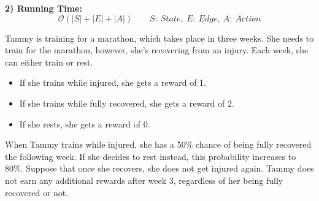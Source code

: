 \documentclass[10pt,a4paper,answers]{exam}
\begin{document}
{\begin{questions}
\begin{solution}
\textbf{2) Running Time:}
\[\mathcal{O}(|S| + |E| + |A|) \qquad S:\ State,\ E:\ Edge,\ A:\ Action\]

\end{solution}


\question[35]
Tammy is training for a marathon, which takes place in three weeks. She needs to train for the marathon, however, she's recovering from an injury. Each week, she can either train or rest. 
\begin{itemize}
    \item If she trains while injured, she gets a reward of 1.
    \item If she trains while fully recovered, she gets a reward of 2.
    \item If she rests, she gets a reward of 0.
\end{itemize}
When Tammy trains while injured, she has a 50\% chance of being fully recovered the following week. If she decides to rest instead, this probability increases to 80\%. Suppose that once she recovers, she does not get injured again. Tammy does not earn any additional rewards after week 3, regardless of her being fully recovered or not. 
\end{questions}}
\end{document}
